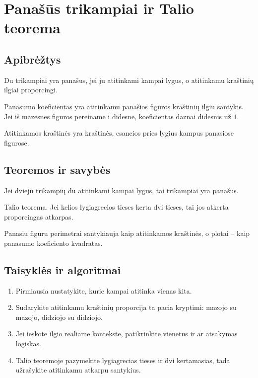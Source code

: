 \section{Panašūs trikampiai ir Talio teorema}\label{sec:panasus-trikampiai-ir-talio-teorema}

\subsection{Apibrėžtys}
\begin{apibreztis}
Du trikampiai yra panašus, jei ju atitinkami kampai lygus, o atitinkamu kraštinių ilgiai proporcingi.
\end{apibreztis}
\begin{apibreztis}
Panasumo koeficientas yra atitinkamu panašios figuros kraštinių ilgiu santykis. Jei iš mazesnes figuros pereiname i didesne, koeficientas daznai didesnis už $1$.
\end{apibreztis}
\begin{apibreztis}
Atitinkamos kraštinės yra kraštinės, esancios pries lygius kampus panasiose figurose.
\end{apibreztis}

\subsection{Teoremos ir savybės}
\begin{teorema}
Jei dvieju trikampių du atitinkami kampai lygus, tai trikampiai yra panašus.
\end{teorema}
\begin{teorema}
Talio teorema. Jei kelios lygiagrecios tieses kerta dvi tieses, tai jos atkerta proporcingas atkarpas.
\end{teorema}
\begin{savybe}
Panasiu figuru perimetrai santykiauja kaip atitinkamos kraštinės, o plotai -- kaip panasumo koeficiento kvadratas.
\end{savybe}

\subsection{Taisyklės ir algoritmai}
\begin{enumerate}[label=\arabic*.]
\item Pirmiausia nustatykite, kurie kampai atitinka vienas kita.
\item Sudarykite atitinkamu kraštinių proporcija ta pacia kryptimi: mazojo su mazojo, didziojo su didziojo.
\item Jei ieskote ilgio realiame kontekste, patikrinkite vienetus ir ar atsakymas logiskas.
\item Talio teoremoje pazymekite lygiagrecias tieses ir dvi kertamasias, tada užrašykite atitinkamu atkarpu santykius.
\end{enumerate}
